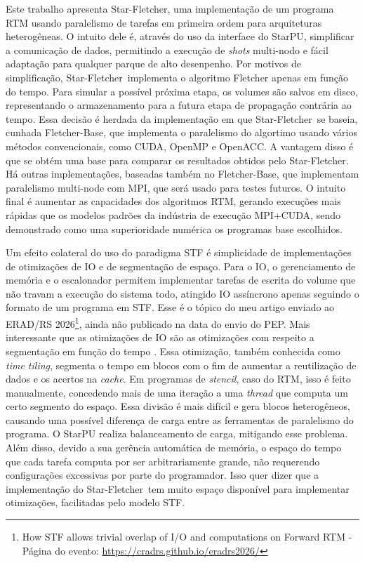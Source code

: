 \documentclass[ppgc,pep]{infufrgs}
\newcommand{\StarFletch}{Star-Fletcher}
\newcommand{\FletchBase}{Fletcher-Base}
\begin{document}
Este trabalho apresenta \StarFletch, uma implementação de um programa RTM usando paralelismo de tarefas em primeira ordem para arquiteturas heterogêneas. O intuito dele é, através do uso da interface do StarPU, simplificar a comunicação de dados, permitindo a execução de \textit{shots} multi-nodo e fácil adaptação para qualquer parque de alto desenpenho. Por motivos de simplificação, \StarFletch\ implementa o algoritmo Fletcher \cite{fletcher_reverse_2009} apenas em função do tempo. Para simular a possível próxima etapa, os volumes são salvos em disco, representando o armazenamento para a futura etapa de propagação contrária ao tempo. Essa decisão é herdada da implementação em que \StarFletch\ se baseia, cunhada \FletchBase, que implementa o paralelismo do algortimo usando vários métodos convencionais, como CUDA, OpenMP e OpenACC. A vantagem disso é que se obtém uma base para comparar os resultados obtidos pelo \StarFletch. Há outras implementações, baseadas também no \FletchBase, que implementam paralelismo multi-node com MPI, que será usado para testes futuros. O intuito final é aumentar as capacidades dos algoritmos RTM, gerando execuções mais rápidas que os modelos padrões da indústria de execução MPI+CUDA, sendo demonstrado como uma superioridade numérica os programas base escolhidos.

Um efeito colateral do uso do paradigma STF é simplicidade de implementações de otimizações de IO e de segmentação de espaço. Para o IO, o gerenciamento de memória e o escalonador permitem implementar tarefas de escrita do volume que não travam a execução do sistema todo, atingido IO assíncrono apenas seguindo o formato de um programa em STF. Esse é o tópico do meu artigo enviado ao ERAD/RS 2026\footnote{How STF allows trivial overlap of I/O and computations on Forward RTM - Página do evento: \url{https://cradrs.github.io/eradrs2026/}}, ainda não publicado na data do envio do PEP. Mais interessante que as otimizações de IO são as otimizações com respeito a segmentação em função do tempo \cite{krishnamoorthy_effective_2007,grosser_hybrid_2018,akbudak_asynchronous_2020,qu_toward_2021,qu_exploiting_2023}. Essa otimização, também conhecida como \textit{time tiling}, segmenta o tempo em blocos com o fim de aumentar a reutilização de dados e os acertos na \textit{cache}. Em programas de \textit{stencil}, caso do RTM, isso é feito manualmente, concedendo mais de uma iteração a uma \textit{thread} que computa um certo segmento do espaço. Essa divisão é mais difícil e gera blocos heterogêneos, causando uma possível diferença de carga entre as ferramentas de paralelismo do programa. O StarPU realiza balanceamento de carga, mitigando esse problema. Além disso, devido a sua gerência automática de memória, o espaço do tempo que cada tarefa computa por ser arbitrariamente grande, não requerendo configurações excessivas por parte do programador. Isso quer dizer que a implementação do \StarFletch\ tem muito espaço disponível para implementar otimizações, facilitadas pelo modelo STF.
\end{document}
